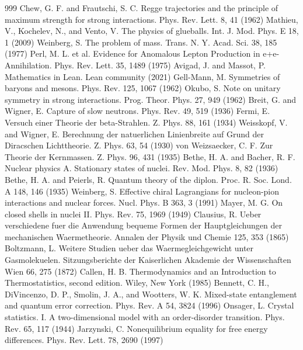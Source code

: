 \begin{thebibliography}{999}
 Chew, G. F. and Frautschi, S. C. Regge trajectories and the principle of maximum strength for strong interactions. Phys. Rev. Lett. 8, 41 (1962)
 Mathieu, V., Kochelev, N., and Vento, V. The physics of glueballs. Int. J. Mod. Phys. E 18, 1 (2009)
 Weinberg, S. The problem of mass. Trans. N. Y. Acad. Sci. 38, 185 (1977)
 Perl, M. L. et al. Evidence for Anomalous Lepton Production in e+e- Annihilation. Phys. Rev. Lett. 35, 1489 (1975)
 Avigad, J. and Massot, P. Mathematics in Lean. Lean community (2021)
 Gell-Mann, M. Symmetries of baryons and mesons. Phys. Rev. 125, 1067 (1962)
 Okubo, S. Note on unitary symmetry in strong interactions. Prog. Theor. Phys. 27, 949 (1962)
 Breit, G. and Wigner, E. Capture of slow neutrons. Phys. Rev. 49, 519 (1936)
 Fermi, E. Versuch einer Theorie der beta-Strahlen. Z. Phys. 88, 161 (1934)
 Weisskopf, V. and Wigner, E. Berechnung der natuerlichen Linienbreite auf Grund der Diracschen Lichttheorie. Z. Phys. 63, 54 (1930)
 von Weizsaecker, C. F. Zur Theorie der Kernmassen. Z. Phys. 96, 431 (1935)
 Bethe, H. A. and Bacher, R. F. Nuclear physics A. Stationary states of nuclei. Rev. Mod. Phys. 8, 82 (1936)
 Bethe, H. A. and Peierls, R. Quantum theory of the diplon. Proc. R. Soc. Lond. A 148, 146 (1935)
 Weinberg, S. Effective chiral Lagrangians for nucleon-pion interactions and nuclear forces. Nucl. Phys. B 363, 3 (1991)
 Mayer, M. G. On closed shells in nuclei II. Phys. Rev. 75, 1969 (1949)
 Clausius, R. Ueber verschiedene fuer die Anwendung bequeme Formen der Hauptgleichungen der mechanischen Waermetheorie. Annalen der Physik und Chemie 125, 353 (1865)
 Boltzmann, L. Weitere Studien ueber das Waermegleichgewicht unter Gasmolekuelen. Sitzungsberichte der Kaiserlichen Akademie der Wissenschaften Wien 66, 275 (1872)
 Callen, H. B. Thermodynamics and an Introduction to Thermostatistics, second edition. Wiley, New York (1985)
 Bennett, C. H., DiVincenzo, D. P., Smolin, J. A., and Wootters, W. K. Mixed-state entanglement and quantum error correction. Phys. Rev. A 54, 3824 (1996)
 Onsager, L. Crystal statistics. I. A two-dimensional model with an order-disorder transition. Phys. Rev. 65, 117 (1944)
 Jarzynski, C. Nonequilibrium equality for free energy differences. Phys. Rev. Lett. 78, 2690 (1997)

\end{thebibliography}
